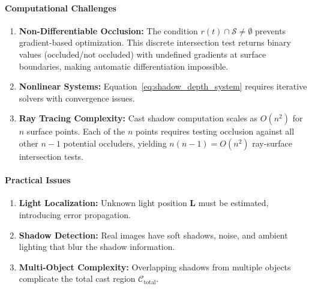 \documentclass[12pt]{article}
\newcommand{\vect}[1]{\bm{#1}}
\theoremstyle{definition}
\begin{document}
\paragraph{Computational Challenges}
\begin{enumerate}[label=\arabic*., resume]
    \item \textbf{Non-Differentiable Occlusion:} The condition $r(t) \cap \mathcal{S} \neq \emptyset$ prevents gradient-based optimization. This discrete intersection test returns binary values (occluded/not occluded) with undefined gradients at surface boundaries, making automatic differentiation impossible.
    
    \item \textbf{Nonlinear Systems:} Equation~\eqref{eq:shadow_depth_system} requires iterative solvers with convergence issues.
    
    \item \textbf{Ray Tracing Complexity:} Cast shadow computation scales as $O(n^2)$ for $n$ surface points. Each of the $n$ points requires testing occlusion against all other $n-1$ potential occluders, yielding $n(n-1) = O(n^2)$ ray-surface intersection tests.
\end{enumerate}

\paragraph{Practical Issues}
\begin{enumerate}[label=\arabic*., resume]
    \item \textbf{Light Localization:} Unknown light position $\vect{L}$ must be estimated, introducing error propagation.
    
    \item \textbf{Shadow Detection:} Real images have soft shadows, noise, and ambient lighting that blur the shadow information.
    
    \item \textbf{Multi-Object Complexity:} Overlapping shadows from multiple objects complicate the total cast region $\mathcal{C}_{\text{total}}$.
\end{enumerate}

\newpage
\end{document}
